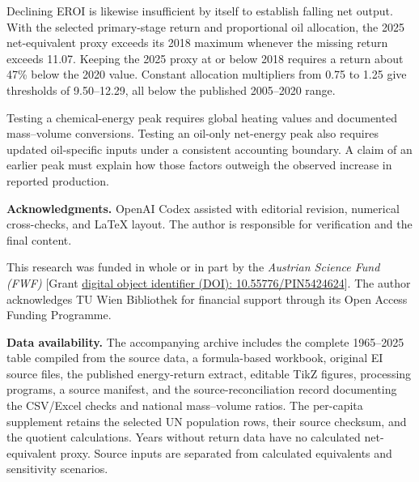 \documentclass[reprint,aps,pra,longbibliography,floatfix]{revtex4-2}
\begin{document}
Declining EROI is likewise insufficient by itself to establish falling net output. With the selected primary-stage return and proportional oil allocation, the 2025 net-equivalent proxy exceeds its 2018 maximum whenever the missing return exceeds 11.07. Keeping the 2025 proxy at or below 2018 requires a return about 47\% below the 2020 value. Constant allocation multipliers from 0.75 to 1.25 give thresholds of 9.50--12.29, all below the published 2005--2020 range.

Testing a chemical-energy peak requires global heating values and documented mass--volume conversions. Testing an oil-only net-energy peak also requires updated oil-specific inputs under a consistent accounting boundary. A claim of an earlier peak must explain how those factors outweigh the observed increase in reported production.

\onecolumngrid
\par\medskip\begingroup\footnotesize
\noindent\textbf{Acknowledgments.}
OpenAI Codex assisted with editorial revision, numerical cross-checks, and LaTeX layout. The author is responsible for verification and the final content.

This research was funded in whole or in part by the \textit{Austrian Science Fund (FWF)} [Grant \href{https://doi.org/10.55776/PIN5424624}{digital object identifier (DOI): 10.55776/PIN5424624}].
The author acknowledges TU Wien Bibliothek for financial support through its Open Access Funding Programme.
\par\medskip

\noindent\textbf{Data availability.}
The accompanying archive includes the complete 1965--2025 table compiled from the source data, a formula-based workbook, original EI source files, the published energy-return extract, editable TikZ figures, processing programs, a source manifest, and the source-reconciliation record documenting the CSV/Excel checks and national mass--volume ratios. The per-capita supplement retains the selected UN population rows, their source checksum, and the quotient calculations. Years without return data have no calculated net-equivalent proxy. Source inputs are separated from calculated equivalents and sensitivity scenarios.
\end{document}
